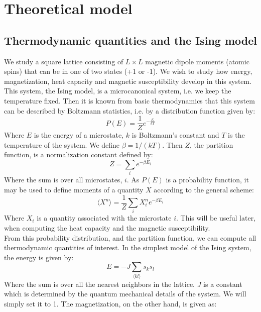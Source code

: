 \documentclass[a4paper, 10pt]{article}
\begin{document}
\section{Theoretical model}
\subsection{Thermodynamic quantities and the Ising model}
We study a square lattice consisting of $L\times L$ magnetic dipole moments (atomic spins) that can be in one of two states (+1 or -1). We wish to study how energy, magnetization, heat capacity and magnetic susceptibility develop in this system. This system, the Ising model, is a microcanonical system, i.e. we keep the temperature fixed. Then it is known from basic thermodynamics that this system can be described by Boltzmann statistics, i.e. by a distribution function given by:
\begin{equation}\label{eq:Boltzmann_probability}
P(E)=\frac{1}{Z}e^{-\frac{E}{kT}}
\end{equation}
Where $E$ is the energy of a microstate, $k$ is Boltzmann's constant and $T$ is the temperature of the system. We define $\beta = 1/(kT)$. Then $Z$, the partition function, is a normalization constant defined by:
\begin{equation}\label{eq:Parition_function}
Z=\sum_{i} e^{-\beta E_i}
\end{equation}
Where the sum is over all microstates, $i$. As $P(E)$ is a probability function, it may be used to define moments of a quantity $X$ according to the general scheme: 
\begin{equation}
\langle X^n \rangle = \frac{1}{Z}\sum_i X_i^n e^{-\beta E_i}
\end{equation}
Where $X_i$ is a quantity associated with the microstate $i$. This will be useful later, when computing the heat capacity and the magnetic susceptibility.\\
\linebreak
From this probability distribution, and the partition function, we can compute all thermodynamic quantities of interest.
\linebreak
In the simplest model of the Ising system, the energy is given by:
\begin{equation}\label{eq:ising_system_energy}
E=-J\sum_{\langle kl \rangle} s_ks_l
\end{equation}
Where the sum is over all the nearest neighbors in the lattice. $J$ is a constant which is determined by the quantum mechanical details of the system. We will simply set it to 1. The magnetization, on the other hand, is given as:
\end{document}

